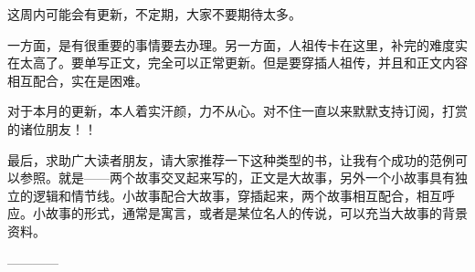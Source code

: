 \begin{this_body}
这周内可能会有更新，不定期，大家不要期待太多。

一方面，是有很重要的事情要去办理。另一方面，人祖传卡在这里，补完的难度实在太高了。要单写正文，完全可以正常更新。但是要穿插人祖传，并且和正文内容相互配合，实在是困难。

对于本月的更新，本人着实汗颜，力不从心。对不住一直以来默默支持订阅，打赏的诸位朋友！！

最后，求助广大读者朋友，请大家推荐一下这种类型的书，让我有个成功的范例可以参照。就是——两个故事交叉起来写的，正文是大故事，另外一个小故事具有独立的逻辑和情节线。小故事配合大故事，穿插起来，两个故事相互配合，相互呼应。小故事的形式，通常是寓言，或者是某位名人的传说，可以充当大故事的背景资料。

------------

\end{this_body}


